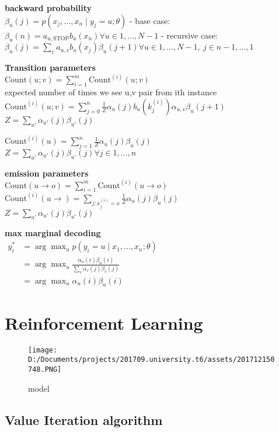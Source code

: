 \documentclass[11pt]{article}
\makeatletter
\def\maxwidth{\ifdim\Gin@nat@width>\linewidth\linewidth
    \else\Gin@nat@width\fi}
\let\Oldincludegraphics\includegraphics
\renewcommand{\includegraphics}[1]{\Oldincludegraphics[width=.8\maxwidth]{#1}}
\makeatother
\begin{document}
\textbf{backward probability}\\
\(\beta_u(j)=p(x_j,...,x_n\mid y_j=u;\theta)\) - base case:
\(\beta_u(n)=a_{u,\text{STOP}}b_u(x_n)\forall u\in1,...,N-1\) -
recursive case:
\(\beta_u(j)=\sum_va_{u,v}b_u(x_j)\beta_u(j+1)\forall u\in1,...,N-1,\ j\in n-1,...,1\)

\textbf{Transition parameters}\\
\(\text{Count}(u;v)=\sum_{i=1}^m\text{Count}^{(i)}(u;v)\)\\
expected number of times we see u,v pair from ith instance\\
\(\text{Count}^{(i)}(u;v)=\sum_{j=0}^n\frac{1}{Z}\alpha_u(j)b_u(k_j^{(i)})\alpha_{u,v}\beta_u(j+1)\)\\
\(Z=\sum_{u'}\alpha_{u'}(j)\beta_{u'}(j)\)

\(\text{Count}^{(i)}(u)=\sum_{j=1}^n\frac{1}{Z}\alpha_u(j)\beta_u(j)\)\\
\(Z=\sum_{u'}\alpha_{u'}(j)\beta_{u'}(j) \forall j\in1,...,n\)

\textbf{emission parameters}\\
\(\text{Count}(u\rightarrow o)=\sum_{i=1}^m\text{Count}^{(i)}(u\rightarrow o)\)\\
\(\text{Count}^{(i)}(u\rightarrow)=\sum_{j:x_j^{(i)}=o}\frac{1}{Z}\alpha_u(j)\beta_u(j)\)\\
\(Z=\sum_{u'}\alpha_{u'}(j)\beta_{u'}(j)\)

\textbf{max marginal decoding}\\
\(\begin{aligned}y_i^*&=\arg\max_up(y_i=u\mid x_1,...,x_n;\theta)\\&=\arg\max_u\frac{\alpha_u(i)\beta_u(i)}{\sum_v\alpha_v(j)\beta_v(j)}\\&=\arg\max_u\alpha_u(i)\beta_u(i)\end{aligned}\)

    \hypertarget{reinforcement-learning}{%
\section{Reinforcement Learning}\label{reinforcement-learning}}

\begin{figure}
\centering
\texttt{[image: D:/Documents/projects/201709.university.t6/assets/201712150748.PNG]}
\caption{model}
\end{figure}

\hypertarget{value-iteration-algorithm}{%
\subsection{Value Iteration algorithm}\label{value-iteration-algorithm}}
\end{document}
